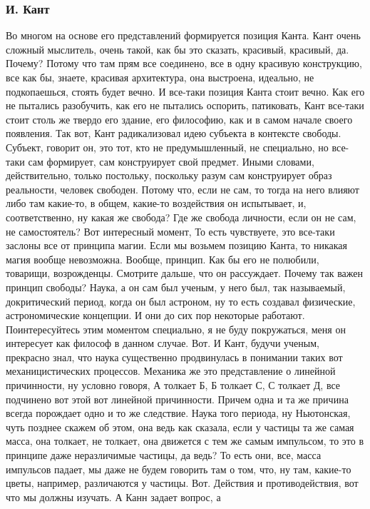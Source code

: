 \subsubsection{И. Кант}
Во многом на основе его представлений формируется позиция Канта. Кант
очень сложный мыслитель, очень такой, как бы это сказать, красивый, красивый,
да. Почему? Потому что там прям все соединено, все в одну красивую конструкцию,
все как бы, знаете, красивая архитектура, она выстроена, идеально, не
подкопаешься, стоять будет вечно. И все-таки позиция Канта стоит вечно. Как его
не пытались разобучить, как его не пытались оспорить, патиковать, Кант все-таки
стоит столь же твердо его здание, его философию, как и в самом начале своего
появления. Так вот, Кант радикализовал идею субъекта в контексте свободы.
Субъект, говорит он, это тот, кто не предумышленный, не специально, но все-таки
сам формирует, сам конструирует свой предмет. Иными словами, действительно,
только постольку, поскольку разум сам конструирует образ реальности, человек
свободен. Потому что, если не сам, то тогда на него влияют либо там какие-то, в
общем, какие-то воздействия он испытывает, и, соответственно, ну какая же
свобода? Где же свобода личности, если он не сам, не самостоятель? Вот
интересный момент, То есть чувствуете, это все-таки заслоны все от принципа
магии. Если мы возьмем позицию Канта, то никакая магия вообще невозможна.
Вообще, принцип. Как бы его не полюбили, товарищи, возрожденцы. Смотрите дальше,
что он рассуждает. Почему так важен принцип свободы? Наука, а он сам был ученым,
у него был, так называемый, докритический период, когда он был астроном, ну то
есть создавал физические, астрономические концепции. И они до сих пор некоторые
работают. Поинтересуйтесь этим моментом специально, я не буду покружаться, меня
он интересует как философ в данном случае. Вот. И Кант, будучи ученым, прекрасно
знал, что наука существенно продвинулась в понимании таких вот механицистических
процессов. Механика же это представление о линейной причинности, ну условно
говоря, А толкает Б, Б толкает С, С толкает Д, все подчинено вот этой вот
линейной причинности. Причем одна и та же причина всегда порождает одно и то же
следствие. Наука того периода, ну Ньютонская, чуть позднее скажем об этом, она
ведь как сказала, если у частицы та же самая масса, она толкает, не толкает, она
движется с тем же самым импульсом, то это в принципе даже неразличимые частицы,
да ведь? То есть они, все, масса импульсов падает, мы даже не будем говорить там
о том, что, ну там, какие-то цветы, например, различаются у частицы. Вот.
Действия и противодействия, вот что мы должны изучать. А Канн задает вопрос, а
